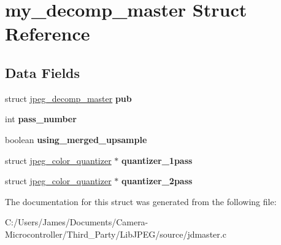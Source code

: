 \hypertarget{structmy__decomp__master}{}\section{my\+\_\+decomp\+\_\+master Struct Reference}
\label{structmy__decomp__master}
\subsection*{Data Fields}
\begin{DoxyCompactItemize}
\item 
\mbox{\label{structmy__decomp__master_ab64a4ab5c3d79db66c90f39ccfcf209a}} 
struct \hyperlink{structjpeg__decomp__master}{jpeg\+\_\+decomp\+\_\+master} {\bfseries pub}
\item 
\mbox{\label{structmy__decomp__master_a0f341c28cc76210dfd9a60c1c2f93257}} 
int {\bfseries pass\+\_\+number}
\item 
\mbox{\label{structmy__decomp__master_af5e5c3879dab91d2c2ad5c3403c4d7d8}} 
boolean {\bfseries using\+\_\+merged\+\_\+upsample}
\item 
\mbox{\label{structmy__decomp__master_a37589b3a5ea49ca9911a7aa31aea98a4}} 
struct \hyperlink{structjpeg__color__quantizer}{jpeg\+\_\+color\+\_\+quantizer} $\ast$ {\bfseries quantizer\+\_\+1pass}
\item 
\mbox{\label{structmy__decomp__master_ac5743b0bd416b62b48040ce243638ed8}} 
struct \hyperlink{structjpeg__color__quantizer}{jpeg\+\_\+color\+\_\+quantizer} $\ast$ {\bfseries quantizer\+\_\+2pass}
\end{DoxyCompactItemize}


The documentation for this struct was generated from the following file\+:\begin{DoxyCompactItemize}
\item 
C\+:/\+Users/\+James/\+Documents/\+Camera-\/\+Microcontroller/\+Third\+\_\+\+Party/\+Lib\+J\+P\+E\+G/source/jdmaster.\+c\end{DoxyCompactItemize}
